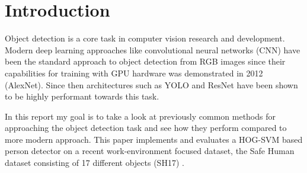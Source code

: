 \section{Introduction}

Object detection is a core task in computer vision research and development. 
Modern deep learning approaches like convolutional neural networks (CNN) have been the standard approach to object detection from RGB images since their capabilities for training with GPU hardware was demonstrated in 2012 (AlexNet).
Since then architectures such as YOLO and ResNet have been shown to be highly performant towards this task.

In this  report my goal is to take a look at previously common methods for approaching the object detection task and see how they perform compared to more modern approach. 
This paper implements and evaluates a HOG-SVM based person detector on a recent work-environment focused dataset, the Safe Human dataset consisting of 17 different objects (SH17) \cite{ahmad2024sh17datasethumansafety}.
